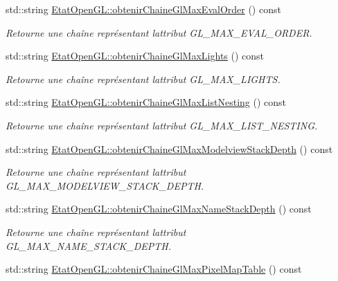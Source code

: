 \begin{DoxyCompactItemize}
std\+::string \hyperlink{group__utilitaire_gaf82e6892182ffe565a05329073a06248}{Etat\+Open\+G\+L\+::obtenir\+Chaine\+Gl\+Max\+Eval\+Order} () const 
\begin{DoxyCompactList}\small\item\em Retourne une chaîne représentant l\textquotesingle{}attribut G\+L\+\_\+\+M\+A\+X\+\_\+\+E\+V\+A\+L\+\_\+\+O\+R\+D\+E\+R. \end{DoxyCompactList}\item 
std\+::string \hyperlink{group__utilitaire_ga95b23ba66220abe4def913fd80f31f9c}{Etat\+Open\+G\+L\+::obtenir\+Chaine\+Gl\+Max\+Lights} () const 
\begin{DoxyCompactList}\small\item\em Retourne une chaîne représentant l\textquotesingle{}attribut G\+L\+\_\+\+M\+A\+X\+\_\+\+L\+I\+G\+H\+T\+S. \end{DoxyCompactList}\item 
std\+::string \hyperlink{group__utilitaire_gaab626bdfc4cf8d6445955270799c969a}{Etat\+Open\+G\+L\+::obtenir\+Chaine\+Gl\+Max\+List\+Nesting} () const 
\begin{DoxyCompactList}\small\item\em Retourne une chaîne représentant l\textquotesingle{}attribut G\+L\+\_\+\+M\+A\+X\+\_\+\+L\+I\+S\+T\+\_\+\+N\+E\+S\+T\+I\+N\+G. \end{DoxyCompactList}\item 
std\+::string \hyperlink{group__utilitaire_ga7a7a64fd525a66dfc542f8d38470e6df}{Etat\+Open\+G\+L\+::obtenir\+Chaine\+Gl\+Max\+Modelview\+Stack\+Depth} () const 
\begin{DoxyCompactList}\small\item\em Retourne une chaîne représentant l\textquotesingle{}attribut G\+L\+\_\+\+M\+A\+X\+\_\+\+M\+O\+D\+E\+L\+V\+I\+E\+W\+\_\+\+S\+T\+A\+C\+K\+\_\+\+D\+E\+P\+T\+H. \end{DoxyCompactList}\item 
std\+::string \hyperlink{group__utilitaire_gad22c079b7e29e5cfb6ee2fe9bb220816}{Etat\+Open\+G\+L\+::obtenir\+Chaine\+Gl\+Max\+Name\+Stack\+Depth} () const 
\begin{DoxyCompactList}\small\item\em Retourne une chaîne représentant l\textquotesingle{}attribut G\+L\+\_\+\+M\+A\+X\+\_\+\+N\+A\+M\+E\+\_\+\+S\+T\+A\+C\+K\+\_\+\+D\+E\+P\+T\+H. \end{DoxyCompactList}\item 
std\+::string \hyperlink{group__utilitaire_ga266533ff4a35f65c19be95594d07f435}{Etat\+Open\+G\+L\+::obtenir\+Chaine\+Gl\+Max\+Pixel\+Map\+Table} () const 

\end{DoxyCompactItemize}
